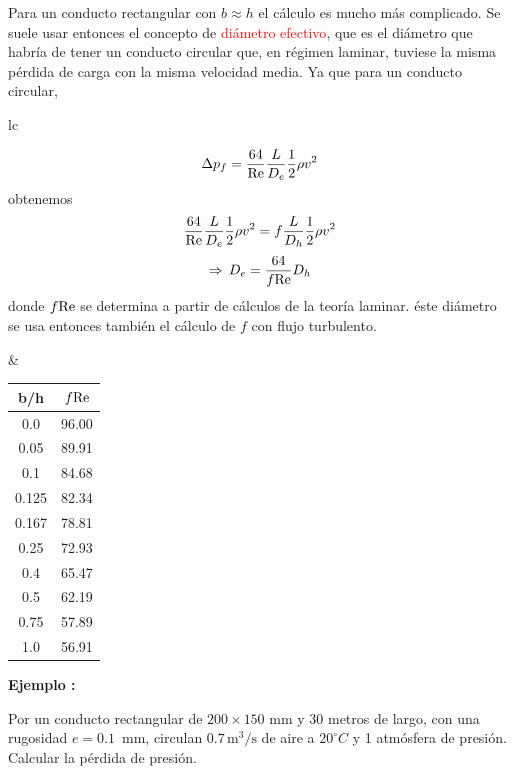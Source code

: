Para un conducto rectangular con $b \approx h$ el cálculo es mucho más complicado. Se suele usar entonces el concepto de \textcolor{red}{diámetro efectivo}, que es el diámetro que habría de tener un conducto circular que, en régimen laminar, tuviese la misma pérdida de carga con la misma velocidad media. Ya que para un conducto circular,

\begin{tabular}{lc}
	\begin{minipage}{0.5\textwidth}
		\[
		\Delta p_f = \frac{64}{\text{Re}}\frac{L}{D_e}\frac{1}{2}\rho v^2
		\]
		obtenemos
		\[
		\frac{64}{\text{Re}}\frac{L}{D_e}\frac{1}{2}\rho v^2 = f \frac{L}{D_h}\frac{1}{2}\rho v^2
		\]
		\[
		\Rightarrow \, D_e = \frac{64}{f \text{Re}} D_h
		\]
		donde $f\text{Re}$ se determina a partir de cálculos de la teoría laminar. éste diámetro se usa entonces también el cálculo de $f$ con flujo turbulento.
		
		\medskip 
		
	\end{minipage}
	&
	\begin{minipage}{0.4\textwidth}
		\begin{center}
			\begin{tabular}{|c|c|}
				\hline b/h & $f\text{Re}$ \\
				\hline
				\hline 0.0 & 96.00 \\
				\hline 0.05 & 89.91 \\
				\hline 0.1 & 84.68 \\
				\hline 0.125 & 82.34 \\
				\hline 0.167 & 78.81 \\
				\hline 0.25 & 72.93 \\
				\hline 0.4 & 65.47 \\
				\hline 0.5 & 62.19 \\
				\hline 0.75 & 57.89 \\
				\hline 1.0 & 56.91 \\
				\hline
			\end{tabular}
		\end{center}
	\end{minipage}
\end{tabular}

\bigskip

\textbf{Ejemplo : }

Por un conducto rectangular de $200\times 150$ mm y 30 metros de largo, con una rugosidad $e=0.1$~mm, circulan $0.7\, \text{m}^3/\text{s}$ de aire a $20^\circ C$ y 1 atmósfera de presión. Calcular la pérdida de presión.

